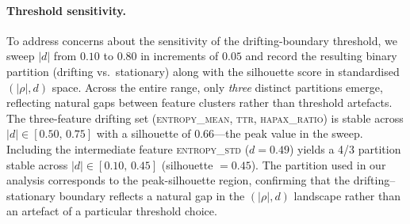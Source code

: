 
\paragraph{Threshold sensitivity.}
To address concerns about the sensitivity of the drifting-boundary threshold,
we sweep $|d|$ from $0.10$ to $0.80$ in increments of $0.05$ and record the
resulting binary partition (drifting vs.\ stationary) along with the silhouette
score in standardised $(\lvert\rho\rvert, d)$ space.
Across the entire range, only \emph{three} distinct partitions emerge,
reflecting natural gaps between feature clusters rather than threshold artefacts.
The three-feature drifting set (\textsc{entropy\_mean}, \textsc{ttr}, \textsc{hapax\_ratio})
is stable across $|d| \in [0.50,\, 0.75]$ with a silhouette of $0.66$---the
peak value in the sweep.
Including the intermediate feature \textsc{entropy\_std} ($d = 0.49$) yields a
4/3 partition stable across $|d| \in [0.10,\, 0.45]$ (silhouette $= 0.45$).
The partition used in our analysis corresponds to the peak-silhouette region,
confirming that the drifting--stationary boundary reflects a natural gap in the
$(\lvert\rho\rvert, d)$ landscape rather than an artefact of a particular
threshold choice.
